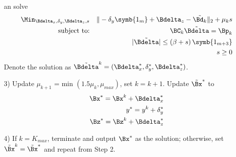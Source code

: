 \noindent
an solve
\setcounter{abc}{0}
\begin{eqnarray} 
\nonumber
\Min_{\Bdelta_x, \delta_y, \Bdelta_z, s}& &\| -\delta_y\symb{1_m} + \Bdelta_z - \tilde{\Bd_k} \|_2 + \mu_ks
\\ 
\nonumber
\mbox{subject to:}& &\BC_k\tilde{\Bdelta}  = \Bp_k 
\\
\nonumber
 & &|\tilde{\Bdelta}|  \leq \left(\beta + s\right)\symb{1_{m+3}} 
 \\
\nonumber
& & s \geq 0
\end{eqnarray}
\noindent
Denote the solution as $\tilde{\Bdelta}^k = (\Bdelta_x^*, \delta_y^*, \Bdelta_z^*)$. 



3) Update  $\mu_{k+1} $ = min $(1.5\mu_k, \mu_{max})$, set $k = k+1$. Update $\tilde{\Bx}^{*}$ to
\setcounter{abc}{0}
\begin{eqnarray} 
\nonumber
\Bx^{*} = \Bx^k + \Bdelta_x^* \\
\nonumber
y^{*} = y^k + \delta_y^* \\
\nonumber
\Bz^{*} = \Bz^k + \Bdelta_z^*
\end{eqnarray}



4) If $k = K_{max}$, terminate and output $\Bx^*$ as the solution; otherwise, set $\tilde{\Bx}^{k} = \tilde{\Bx}^{*}$  and repeat from Step 2. 

